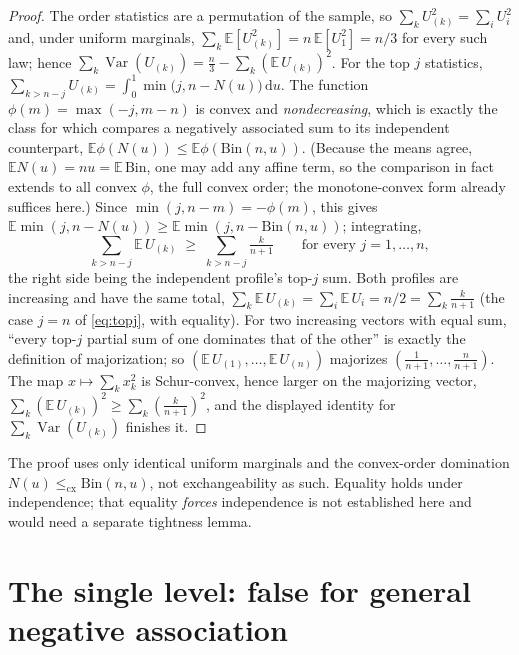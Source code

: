 \documentclass[11pt]{article}
\begin{document}
\begin{proof}
The order statistics are a permutation of the sample, so $\sum_k U_{(k)}^2=\sum_i U_i^2$ and, under
uniform marginals, $\sum_k\mathbb E[U_{(k)}^2]=n\,\mathbb E[U_1^2]=n/3$ for every such law; hence
$\sum_k\operatorname{Var}(U_{(k)})=\tfrac n3-\sum_k(\mathbb E\,U_{(k)})^2$. For the top $j$ statistics,
$\sum_{k>n-j}U_{(k)}=\int_0^1\min\!\big(j,n-N(u)\big)\,\mathrm du$. The function $\phi(m)=\max(-j,m-n)$
is convex and \emph{nondecreasing}, which is exactly the class for which \citet{shao2000} compares a
negatively associated sum to its independent counterpart, $\mathbb E\phi(N(u))\le\mathbb E\phi(\mathrm{Bin}(n,u))$.
(Because the means agree, $\mathbb E N(u)=nu=\mathbb E\,\mathrm{Bin}$, one may add any affine term, so
the comparison in fact extends to all convex $\phi$, the full convex order; the monotone-convex form
already suffices here.) Since $\min(j,n-m)=-\phi(m)$, this gives
$\mathbb E\min(j,n-N(u))\ge\mathbb E\min(j,n-\mathrm{Bin}(n,u))$; integrating,
\begin{equation}\label{eq:topj}
\sum_{k>n-j}\mathbb E\,U_{(k)}\;\ge\;\sum_{k>n-j}\tfrac{k}{n+1}\qquad\text{for every }j=1,\dots,n,
\end{equation}
the right side being the independent profile's top-$j$ sum. Both profiles are increasing and have the
same total, $\sum_k\mathbb E\,U_{(k)}=\sum_i\mathbb E\,U_i=n/2=\sum_k\tfrac k{n+1}$ (the case $j=n$ of
\eqref{eq:topj}, with equality). For two increasing vectors with equal sum, ``every top-$j$ partial
sum of one dominates that of the other'' is exactly the definition of majorization; so
$(\mathbb E\,U_{(1)},\dots,\mathbb E\,U_{(n)})$ majorizes $(\tfrac1{n+1},\dots,\tfrac n{n+1})$. The map
$x\mapsto\sum_k x_k^2$ is Schur-convex, hence larger on the majorizing vector,
$\sum_k(\mathbb E\,U_{(k)})^2\ge\sum_k(\tfrac k{n+1})^2$, and the displayed identity for
$\sum_k\operatorname{Var}(U_{(k)})$ finishes it.
\end{proof}

The proof uses only identical uniform marginals and the convex-order domination
$N(u)\le_{\mathrm{cx}}\mathrm{Bin}(n,u)$, not exchangeability as such. Equality holds under
independence; that equality \emph{forces} independence is not established here and would need a
separate tightness lemma.

\section{The single level: false for general negative association}
\end{document}
